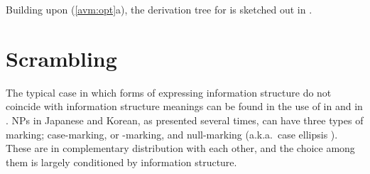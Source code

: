 \noindent Building upon (\ref{avm:opt}a), the derivation tree for
 is sketched out in
.




\section{Scrambling}
\label{10:sec:scrambling}


The typical case in which forms of expressing information structure do
not coincide with information structure meanings can be found in the
use of \wa in  and \nun in .
NPs in Japanese and Korean, as presented several times, can have three
types of marking; case-marking, \wa or \nun-marking, and null-marking
(a.k.a.\ case ellipsis \citep{yatabe:99,sato:tam:12}). These are in
complementary distribution with each other, and the choice among them
is largely conditioned by information structure.



